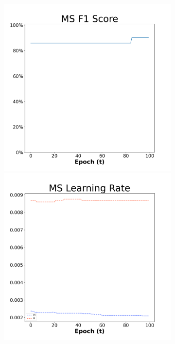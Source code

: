 \begin{figure}[H]
    \centering %
\begin{subfigure}{0.3\textwidth}
  \includegraphics[width=\linewidth]{images/exper2/Sonar/MS_0.01_f1.png}
    \includegraphics[width=\linewidth]{images/exper2/Sonar/MS_0.01_lr.png}

\end{subfigure}
\end{figure}
